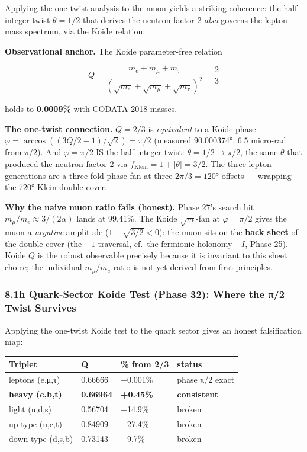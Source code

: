 \documentclass[
]{article}
\begin{document}
Applying the one-twist analysis to the muon yields a striking coherence:
the half-integer twist \(\theta = 1/2\) that derives the neutron
factor-2 \emph{also} governs the lepton mass spectrum, via the Koide
relation.

\textbf{Observational anchor.} The Koide parameter-free relation

\[Q = \frac{m_e + m_\mu + m_\tau}{(\sqrt{m_e} + \sqrt{m_\mu} + \sqrt{m_\tau})^2} = \frac{2}{3}\]

holds to \textbf{0.0009\%} with CODATA 2018 masses.

\textbf{The one-twist connection.} \(Q = 2/3\) is \emph{equivalent} to a
Koide phase \(\varphi = \arccos((3Q/2 - 1)/\sqrt{2}) = \pi/2\) (measured
90.000374°, 6.5 micro-rad from \(\pi/2\)). And \(\varphi = \pi/2\) IS
the half-integer twist: \(\theta = 1/2 \to \pi/2\), the same \(\theta\)
that produced the neutron factor-2 via
\(f_{\text{Klein}} = 1 + |\theta| = 3/2\). The three lepton generations
are a three-fold phase fan at three \(2\pi/3 = 120°\) offsets ---
wrapping the 720° Klein double-cover.

\textbf{Why the naive muon ratio fails (honest).} Phase 27's search hit
\(m_\mu/m_e \approx 3/(2\alpha)\) lands at 99.41\%. The Koide
\(\sqrt{m}\)-fan at \(\varphi = \pi/2\) gives the muon a \emph{negative}
amplitude (\(1 - \sqrt{3/2} < 0\)): the muon sits on the \textbf{back
sheet} of the double-cover (the \(-1\) traversal, cf.~the fermionic
holonomy \(-I\), Phase 25). Koide \(Q\) is the robust observable
precisely because it is invariant to this sheet choice; the individual
\(m_\mu/m_e\) ratio is not yet derived from first principles.

\subsubsection{8.1h Quark-Sector Koide Test (Phase 32): Where the π/2
Twist
Survives}\label{h-quark-sector-koide-test-phase-32-where-the-ux3c02-twist-survives}

Applying the one-twist Koide test to the quark sector gives an honest
falsification map:

\begin{longtable}[]{@{}llll@{}}
\toprule\noalign{}
Triplet & Q & \% from 2/3 & status \\
\midrule\noalign{}
\endhead
\bottomrule\noalign{}
\endlastfoot
leptons (e,μ,τ) & 0.66666 & −0.001\% & phase π/2 exact \\
\textbf{heavy (c,b,t)} & \textbf{0.66964} & \textbf{+0.45\%} &
\textbf{consistent} \\
light (u,d,s) & 0.56704 & −14.9\% & broken \\
up-type (u,c,t) & 0.84909 & +27.4\% & broken \\
down-type (d,s,b) & 0.73143 & +9.7\% & broken \\
\end{longtable}
\end{document}
